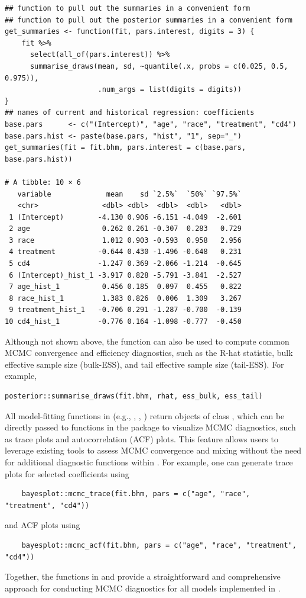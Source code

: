 \begin{verbatim}
## function to pull out the summaries in a convenient form
## function to pull out the posterior summaries in a convenient form
get_summaries <- function(fit, pars.interest, digits = 3) {
    fit %>%
      select(all_of(pars.interest)) %>%
      summarise_draws(mean, sd, ~quantile(.x, probs = c(0.025, 0.5, 0.975)),
                      .num_args = list(digits = digits))
}
## names of current and historical regression: coefficients
base.pars      <- c("(Intercept)", "age", "race", "treatment", "cd4")
base.pars.hist <- paste(base.pars, "hist", "1", sep="_")
get_summaries(fit = fit.bhm, pars.interest = c(base.pars, base.pars.hist))

# A tibble: 10 × 6
   variable             mean    sd `2.5%`  `50%` `97.5%`
   <chr>               <dbl> <dbl>  <dbl>  <dbl>   <dbl>
 1 (Intercept)        -4.130 0.906 -6.151 -4.049  -2.601
 2 age                 0.262 0.261 -0.307  0.283   0.729
 3 race                1.012 0.903 -0.593  0.958   2.956
 4 treatment          -0.644 0.430 -1.496 -0.648   0.231
 5 cd4                -1.247 0.369 -2.066 -1.214  -0.645
 6 (Intercept)_hist_1 -3.917 0.828 -5.791 -3.841  -2.527
 7 age_hist_1          0.456 0.185  0.097  0.455   0.822
 8 race_hist_1         1.383 0.826  0.006  1.309   3.267
 9 treatment_hist_1   -0.706 0.291 -1.287 -0.700  -0.139
10 cd4_hist_1         -0.776 0.164 -1.098 -0.777  -0.450
\end{verbatim}

Although not shown above, the  function can also be used to compute common MCMC convergence and efficiency diagnostics, such as the R-hat statistic, bulk effective sample size (bulk-ESS), and tail effective sample size (tail-ESS). For example, 
\begin{verbatim}
posterior::summarise_draws(fit.bhm, rhat, ess_bulk, ess_tail)
\end{verbatim}
All model-fitting functions in  (e.g., , , ) return objects of class , which can be directly passed to functions in the  package \citep{bayesplot_pkg} to visualize MCMC diagnostics, such as trace plots and autocorrelation (ACF) plots. This feature allows users to leverage existing tools to assess MCMC convergence and mixing without the need for additional diagnostic functions within . For example, one can generate trace plots for selected coefficients using 
\begin{verbatim}
    bayesplot::mcmc_trace(fit.bhm, pars = c("age", "race", "treatment", "cd4"))
\end{verbatim}
and ACF plots using
\begin{verbatim}
    bayesplot::mcmc_acf(fit.bhm, pars = c("age", "race", "treatment", "cd4"))
\end{verbatim}
Together, the functions in  and  provide a straightforward and comprehensive approach for conducting MCMC diagnostics for all models implemented in .

